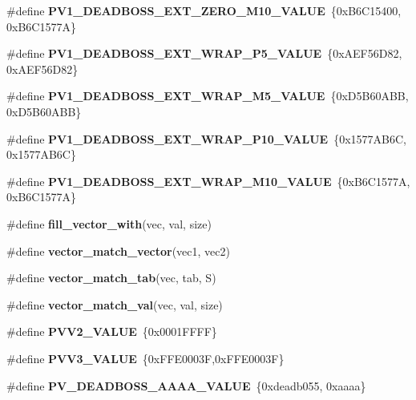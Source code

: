 \begin{DoxyCompactItemize}
\item 
\mbox{\label{unit-test-bit-vector_8c_a3ed76d9952e6eef1aa1e92dffd8f06f5}} 
\#define {\bfseries P\+V1\+\_\+\+D\+E\+A\+D\+B\+O\+S\+S\+\_\+\+E\+X\+T\+\_\+\+Z\+E\+R\+O\+\_\+\+M10\+\_\+\+V\+A\+L\+UE}~\{0x\+B6\+C15400, 0x\+B6\+C1577\+A\}
\item 
\mbox{\label{unit-test-bit-vector_8c_a78e872e1901cc92fc6b3cead809380f6}} 
\#define {\bfseries P\+V1\+\_\+\+D\+E\+A\+D\+B\+O\+S\+S\+\_\+\+E\+X\+T\+\_\+\+W\+R\+A\+P\+\_\+\+P5\+\_\+\+V\+A\+L\+UE}~\{0x\+A\+E\+F56\+D82, 0x\+A\+E\+F56\+D82\}
\item 
\mbox{\label{unit-test-bit-vector_8c_a3a43c7efd63a4c08b7a98bfd0b6fe5ab}} 
\#define {\bfseries P\+V1\+\_\+\+D\+E\+A\+D\+B\+O\+S\+S\+\_\+\+E\+X\+T\+\_\+\+W\+R\+A\+P\+\_\+\+M5\+\_\+\+V\+A\+L\+UE}~\{0x\+D5\+B60\+A\+B\+B, 0x\+D5\+B60\+A\+B\+B\}
\item 
\mbox{\label{unit-test-bit-vector_8c_a8736262149d96e63c17a485edd86e0e3}} 
\#define {\bfseries P\+V1\+\_\+\+D\+E\+A\+D\+B\+O\+S\+S\+\_\+\+E\+X\+T\+\_\+\+W\+R\+A\+P\+\_\+\+P10\+\_\+\+V\+A\+L\+UE}~\{0x1577\+A\+B6\+C, 0x1577\+A\+B6\+C\}
\item 
\mbox{\label{unit-test-bit-vector_8c_aa53e2611367b12d68ad55232ff2f954d}} 
\#define {\bfseries P\+V1\+\_\+\+D\+E\+A\+D\+B\+O\+S\+S\+\_\+\+E\+X\+T\+\_\+\+W\+R\+A\+P\+\_\+\+M10\+\_\+\+V\+A\+L\+UE}~\{0x\+B6\+C1577\+A, 0x\+B6\+C1577\+A\}
\item 
\#define {\bfseries fill\+\_\+vector\+\_\+with}(vec,  val,  size)
\item 
\#define {\bfseries vector\+\_\+match\+\_\+vector}(vec1,  vec2)
\item 
\#define {\bfseries vector\+\_\+match\+\_\+tab}(vec,  tab,  S)
\item 
\#define {\bfseries vector\+\_\+match\+\_\+val}(vec,  val,  size)
\item 
\mbox{\label{unit-test-bit-vector_8c_ae02af2c3c817c7e7a340bf1b6bfb6365}} 
\#define {\bfseries P\+V\+V2\+\_\+\+V\+A\+L\+UE}~\{0x0001\+F\+F\+F\+F\}
\item 
\mbox{\label{unit-test-bit-vector_8c_a5ac9a15d848c17632f11e30c5cfa6939}} 
\#define {\bfseries P\+V\+V3\+\_\+\+V\+A\+L\+UE}~\{0x\+F\+F\+E0003\+F,0x\+F\+F\+E0003\+F\}
\item 
\mbox{\label{unit-test-bit-vector_8c_a734c60f2b8f212d784e6f4067a59daad}} 
\#define {\bfseries P\+V\+\_\+\+D\+E\+A\+D\+B\+O\+S\+S\+\_\+\+A\+A\+A\+A\+\_\+\+V\+A\+L\+UE}~\{0xdeadb055, 0xaaaa\}
\end{DoxyCompactItemize}
